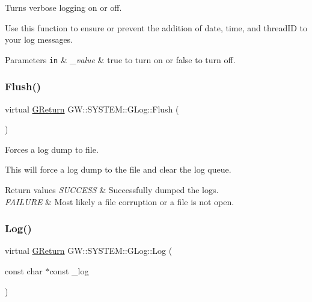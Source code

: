 Turns verbose logging on or off. 

Use this function to ensure or prevent the addition of date, time, and thread\+ID to your log messages.


\begin{DoxyParams}[1]{Parameters}
\mbox{\tt in}  & {\em \+\_\+value} & true to turn on or false to turn off. \\
\hline
\end{DoxyParams}
\mbox{\label{classGW_1_1SYSTEM_1_1GLog_a07147c15ecb17caa1c83974b3c54f7d4}} 
\subsubsection{\texorpdfstring{Flush()}{Flush()}}
{\footnotesize\ttfamily virtual \hyperlink{namespaceGW_a67a839e3df7ea8a5c5686613a7a3de21}{G\+Return} G\+W\+::\+S\+Y\+S\+T\+E\+M\+::\+G\+Log\+::\+Flush (\begin{DoxyParamCaption}{ }\end{DoxyParamCaption})\hspace{0.3cm}{\ttfamily [pure virtual]}}



Forces a log dump to file. 

This will force a log dump to the file and clear the log queue.


\begin{DoxyRetVals}{Return values}
{\em S\+U\+C\+C\+E\+SS} & Successfully dumped the logs. \\
\hline
{\em F\+A\+I\+L\+U\+RE} & Most likely a file corruption or a file is not open. \\
\hline
\end{DoxyRetVals}
\mbox{\label{classGW_1_1SYSTEM_1_1GLog_a9e21e702d012065fe799b4c49f7ac670}} 
\subsubsection{\texorpdfstring{Log()}{Log()}}
{\footnotesize\ttfamily virtual \hyperlink{namespaceGW_a67a839e3df7ea8a5c5686613a7a3de21}{G\+Return} G\+W\+::\+S\+Y\+S\+T\+E\+M\+::\+G\+Log\+::\+Log (\begin{DoxyParamCaption}\item[{const char $\ast$const}]{\+\_\+log }\end{DoxyParamCaption})\hspace{0.3cm}{\ttfamily [pure virtual]}}



